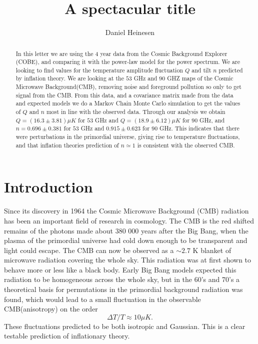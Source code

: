 \documentclass{emulateapj}
\begin{document}
\title{A spectacular title}

\author{Daniel Heinesen}





\begin{abstract}
In this letter we are using the 4 year data from the Cosmic Background Explorer (COBE), and comparing it with the power-law model for the power spectrum. We are looking to find values for the temperature amplitude fluctuation $Q$ and tilt $n$ predicted by inflation theory. We are looking at the $53$ GHz and $90$ GHZ maps of the Cosmic Microwave Background(CMB), removing noise and foreground pollution so only to get signal from the CMB. From this data, and a covariance matrix made from the data and expected models we do a Markov Chain Monte Carlo simulation to get the values of $Q$ and $n$ most in line with the observed data. Through our analysis we obtain $Q = (16.3 \pm 3.81)\mu K$ for $53$ GHz and $Q = (18.9 \pm 6.12)\mu K$ for $90$ GHz, and $n = 0.696 \pm 0.381$ for $53$ GHz and $0.915 \pm 0.623$ for $90$ GHz. This indicates that there were perturbations in the primordial universe, giving rise to temperature fluctuations, and that inflation theories prediction of $n \simeq 1$ is consistent with the observed CMB.
\end{abstract}

\section{Introduction}
\label{sec:introduction}

Since its discovery in 1964 \citep{wilson} the Cosmic Microwave Background (CMB) radiation has been an important field of research in cosmology. The CMB is the red shifted remains of the photons made about 380 000 years after the Big Bang, when the plasma of the primordial universe had cold down enough to be transparent and light could escape. The CMB can now be observed as a $\sim 2.7$ K blanket of microwave radiation covering the whole sky. This radiation was at first shown to behave more or less like a black body. Early Big Bang models expected this radiation to be homogeneous across the whole sky, but in the 60's and 70's a theoretical basis for permutations in the primordial background radiation was found\citep{sunyaev}, which would lead to a small fluctuation in the observable CMB(anisotropy) on the order
\begin{equation}
{\Delta T}/{T} \approx 10 \mu K.
\end{equation} These fluctuations predicted to be both isotropic and Gaussian. This is a clear testable prediction of inflationary theory. 
\end{document}
